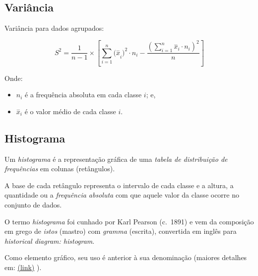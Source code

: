 \documentclass[
]{book}
\providecommand{\tightlist}{%
  \setlength{\itemsep}{0pt}\setlength{\parskip}{0pt}}
\begin{document}
\hypertarget{variuxe2ncia}{%
\subsection{Variância}\label{variuxe2ncia}}

\hfill\break

Variância para dados agrupados:

\hfill\break

\[
S^{2}= \frac{1}{n-1} \times \left[  \sum _{i=1}^{n}{(\stackrel{-}{x}}_{i})^{2} \cdot {n}_{i} - \frac{{\left(\sum _{i=1}^{n}{\stackrel{-}{x}}_{i} \cdot {n}_{i}\right)}^{2}  }{n}\right]
\]

\hfill\break

Onde:

\hfill\break

\begin{itemize}
\tightlist
\item
  \(n_{i}\) é a frequência absoluta em cada classe \(i\); e,
\item
  \(\stackrel{-}{x}_{i}\) é o valor médio de cada classe \(i\).
\end{itemize}

\hypertarget{histograma}{%
\subsection{Histograma}\label{histograma}}

\hfill\break

Um \emph{histograma} é a representação gráfica de uma \emph{tabela de distribuição de frequências} em colunas (retângulos).

\hfill\break

A base de cada retângulo representa o intervalo de cada classe e a altura, a quantidade ou a \emph{frequência absoluta} com que aquele valor da classe ocorre no conjunto de dados.

\hfill\break

O termo \emph{histograma} foi cunhado por Karl Pearson (c.~1891) e vem da composição em grego de \emph{istos} (mastro) com \emph{gramma} (escrita), convertida em inglês para \emph{historical diagram: histogram}.

\hfill\break

Como elemento gráfico, seu uso é anterior à sua denominação (maiores detalhes em:
\href{https://www.ine.es/ss/Satellite?blobcol=urldata\&blobheader=application\%2Fpdf\&blobheadername1=Content-Disposition\&blobheadervalue1=attachment\%3B+filename\%3Dart_192_2.pdf\&blobkey=urldata\&blobtable=MungoBlobs\&blobwhere=229\%2F670\%2Fart_192_2.pdf\&ssbinary=true}{(link)} ).
\end{document}
